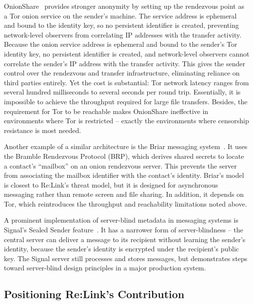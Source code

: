 \documentclass[12pt,a4paper,oneside]{report}
\begin{document}
OnionShare~\cite{onionshare} provides stronger anonymity by setting up the rendezvous point as a Tor onion service on the sender's machine. The service address is ephemeral and bound to the identity key, so no persistent identifier is created, preventing network-level observers from correlating IP addresses with the transfer activity. Because the onion service address is ephemeral and bound to the sender's Tor identity key, no persistent identifier is created, and network-level observers cannot correlate the sender's IP address with the transfer activity. This gives the sender control over the rendezvous and transfer infrastructure, eliminating reliance on third parties entirely. Yet the cost is substantial: Tor network latency ranges from several hundred milliseconds to several seconds per round trip. Essentially, it is impossible to achieve the throughput required for large file transfers. Besides, the requirement for Tor to be reachable makes OnionShare ineffective in environments where Tor is restricted -- exactly the environments where censorship resistance is most needed.

Another example of a similar architecture is the Briar messaging system~\cite{briar}. It uses the Bramble Rendezvous Protocol (BRP), which derives shared secrets to locate a contact's ``mailbox'' on an onion rendezvous server. This prevents the server from associating the mailbox identifier with the contact's identity. Briar's model is closest to Re:Link's threat model, but it is designed for asynchronous messaging rather than remote screen and file sharing. In addition, it depends on Tor, which reintroduces the throughput and reachability limitations noted above.

A prominent implementation of server-blind metadata in messaging systems is Signal's Sealed Sender feature~\cite{signalsealed}. It has a narrower form of server-blindness -- the central server can deliver a message to its recipient without learning the sender's identity, because the sender's identity is encrypted under the recipient's public key. The Signal server still processes and stores messages, but demonstrates steps toward server-blind design principles in a major production system.


\subsection{Positioning Re:Link's Contribution}
\label{sec:positioning}
\end{document}
